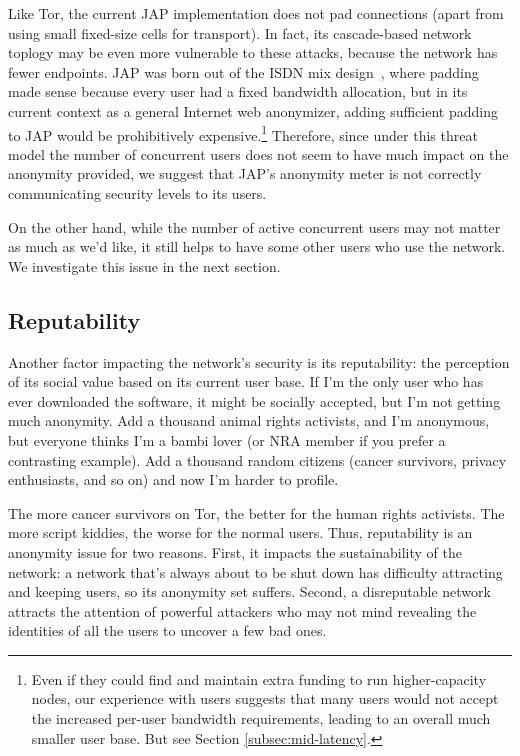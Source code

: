 \documentclass{llncs}
\begin{document}
Like Tor, the current JAP implementation does not pad connections
(apart from using small fixed-size cells for transport). In fact,
its cascade-based network toplogy may be even more vulnerable to these
attacks, because the network has fewer endpoints. JAP was born out of
the ISDN mix design~\cite{isdn-mixes}, where padding made sense because
every user had a fixed bandwidth allocation, but in its current context
as a general Internet web anonymizer, adding sufficient padding to JAP
would be prohibitively expensive.\footnote{Even if they could find and
maintain extra funding to run higher-capacity nodes, our experience with
users suggests that many users would not accept the increased per-user
bandwidth requirements, leading to an overall much smaller user base. But
see Section \ref{subsec:mid-latency}.} Therefore, since under this threat
model the number of concurrent users does not seem to have much impact
on the anonymity provided, we suggest that JAP's anonymity meter is not
correctly communicating security levels to its users.

On the other hand, while the number of active concurrent users may not
matter as much as we'd like, it still helps to have some other users
who use the network. We investigate this issue in the next section.

\subsection{Reputability}

Another factor impacting the network's security is its reputability:
the perception of its social value based on its current user base. If I'm
the only user who has ever downloaded the software, it might be socially
accepted, but I'm not getting much anonymity. Add a thousand animal rights
activists, and I'm anonymous, but everyone thinks I'm a bambi lover (or
NRA member if you prefer a contrasting example). Add a thousand
random citizens (cancer survivors, privacy enthusiasts, and so on)
and now I'm harder to profile.

The more cancer survivors on Tor, the better for the human rights
activists. The more script kiddies, the worse for the normal users. Thus,
reputability is an anonymity issue for two reasons. First, it impacts
the sustainability of the network: a network that's always about to be
shut down has difficulty attracting and keeping users, so its anonymity
set suffers. Second, a disreputable network attracts the attention of
powerful attackers who may not mind revealing the identities of all the
users to uncover a few bad ones.
\end{document}
